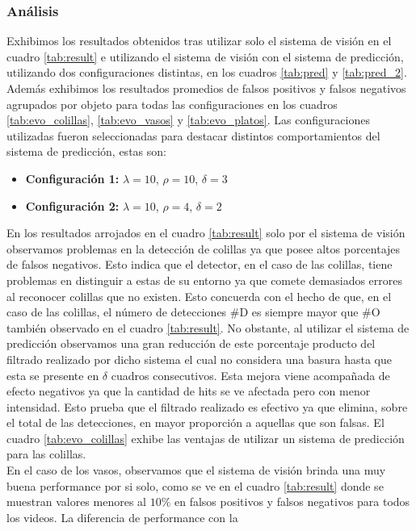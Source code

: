 \subsubsection{Análisis}
Exhibimos los resultados obtenidos tras utilizar solo el sistema de 
visión en el cuadro \ref{tab:result} e utilizando el sistema de 
visión con el sistema de predicción, utilizando dos configuraciones 
distintas, en 
los cuadros \ref{tab:pred} y  \ref{tab:pred_2}. Además exhibimos los 
resultados promedios de falsos positivos y falsos negativos agrupados 
por objeto para todas las configuraciones en los cuadros \ref{tab:evo_colillas}, 
\ref{tab:evo_vasos} y \ref{tab:evo_platos}. Las configuraciones 
utilizadas fueron seleccionadas para destacar distintos comportamientos del 
sistema de predicción, estas son:
\begin{itemize}
\item{\textbf{Configuración 1:} $\lambda=10$, $\rho=10$, $\delta=3$}
\item{\textbf{Configuración 2:} $\lambda=10$, $\rho=4$, $\delta=2$}
\end{itemize}
\indent En los resultados arrojados en el cuadro \ref{tab:result} solo por el sistema de visión 
observamos problemas en la  detección de colillas ya que posee altos 
porcentajes de falsos negativos. Esto indica que el detector, en el 
caso de las colillas, tiene
problemas en distinguir a estas de su entorno ya que comete 
demasiados errores al reconocer colillas que no existen. Esto concuerda 
con el hecho de que, en el caso de las colillas, el número de 
detecciones \#D es siempre mayor que \#O también observado en el 
cuadro \ref{tab:result}. No obstante, al utilizar el sistema de 
predicción observamos una gran reducción de este porcentaje producto 
del filtrado realizado por dicho sistema el cual no considera una 
basura hasta que esta se presente en $\delta$ cuadros consecutivos.  
Esta mejora viene acompañada de efecto negativos ya que la cantidad de 
hits se ve afectada pero con menor intensidad. Esto prueba que el 
filtrado realizado es efectivo ya que elimina, sobre el total de las 
detecciones, en mayor proporción a 
aquellas que son falsas. El cuadro \ref{tab:evo_colillas} exhibe las ventajas de utilizar un sistema de 
predicción para las colillas.\\
\indent 
En el caso de los vasos, observamos que el sistema de visión brinda 
una muy buena performance por si solo, como se ve en el cuadro \ref{tab:result} 
donde se muestran valores menores al $10\%$ en falsos positivos y falsos 
negativos para todos los videos. La diferencia de performance con la 
